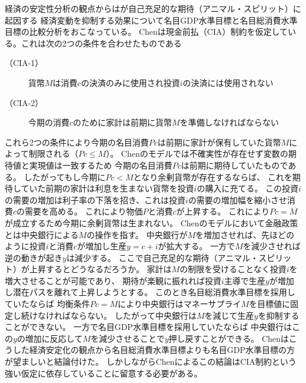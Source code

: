 経済の安定性分析の観点からは\textcite{Chen2019}が自己充足的な期待（アニマル・スピリット）に起因する
経済変動を抑制する効果について名目GDP水準目標と名目総消費水準目標の比較分析をおこなっている。
Chenは現金前払（CIA）制約を仮定している。これは次の2つの条件を合わせたものである

\begin{description}
  \item[（CIA-1）]貨幣\(M\)は消費\(c\)の決済のみに使用され投資\(i\)の決済には使用されない
  \item[（CIA-2）]今期の消費\(c\)のために家計は前期に貨幣\(M\)を準備しなければならない
\end{description}

これら2つの条件により今期の名目消費\(Pc\)は前期に家計が保有していた貨幣\(M\)によって制限される（\(Pc\le M\)）。
Chenのモデルでは不確実性が存在せず変数の期待値と実現値は一致するため
今期の名目消費\(Pc\)は前期に期待していたものである。
したがってもし今期に\(Pc<M\)となり余剰貨幣が存在するならば、
これを期待していた前期の家計は利息を生まない貨幣を投資\(i\)の購入に充てる。
この投資\(i\)の需要の増加は利子率の下落を招き、これは投資\(i\)の需要の増加幅を縮小させ消費\(c\)の需要を高める。
これにより物価\(P\)と消費\(c\)が上昇する。
これにより\(Pc=M\)が成立するため今期に余剰貨幣は生まれない。
Chenのモデルにおいて金融政策とは中央銀行による\(M\)の操作を指す。
中央銀行が\(M\)を増加させれば、先ほどのように投資\(i\)と消費\(c\)が増加し生産\(y=c+i\)が拡大する。
一方で\(M\)を減少させれば逆の動きが起き\(y\)は減少する。
ここで自己充足的な期待（アニマル・スピリット）が上昇するとどうなるだろうか。
家計は\(M\)の制限を受けることなく投資\(i\)を増大させることが可能であり、
期待が楽観に振れれば投資\(i\)主導で生産\(y\)が増加し潜在パスを離れて上昇しようとする。
このとき名目総消費水準目標を採用していたならば
均衡条件\(Pc=M\)により中央銀行はマネーサプライ\(M\)を目標値に固定し続けなければならない。
したがって中央銀行は\(M\)を減じて生産\(y\)を抑制することができない。
一方で名目GDP水準目標を採用していたならば
中央銀行はこの\(y\)の増加に反応して\(M\)を減少させることで\(y\)押し戻すことができる。
Chenはこうした経済安定化の観点から名目総消費水準目標よりも名目GDP水準目標の方が望ましいと結論付けた。
しかしながらChenによるこの結論はCIA制約という強い仮定に依存していることに留意する必要がある。

